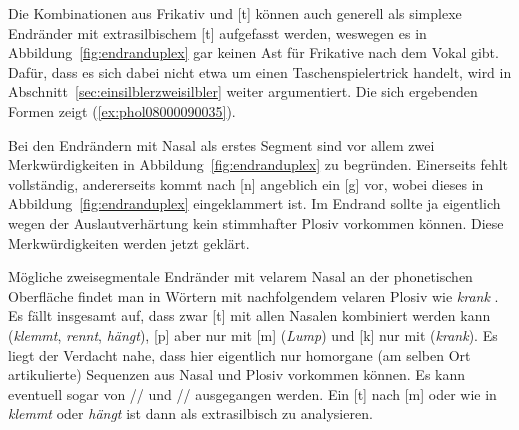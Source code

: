 \begin{exe}
  \ex \label{ex:phol0800009003}
  \begin{xlist}
  \end{xlist}
\end{exe}

Die Kombinationen aus Frikativ und [t] können auch generell als simplexe Endränder mit extrasilbischem [t] aufgefasst werden, weswegen es in Abbildung~\ref{fig:endranduplex} gar keinen Ast für Frikative nach dem Vokal gibt.
Dafür, dass es sich dabei nicht etwa um einen Taschenspielertrick handelt, wird in Abschnitt~\ref{sec:einsilblerzweisilbler} weiter argumentiert.
Die sich ergebenden Formen zeigt (\ref{ex:phol08000090035}).

\begin{exe}
  \ex \label{ex:phol08000090035}
  \begin{xlist}
  \end{xlist}
\end{exe}

Bei den Endrändern mit Nasal als erstes Segment sind vor allem zwei Merkwürdigkeiten in Abbildung~\ref{fig:endranduplex} zu begründen.
Einerseits fehlt \textipa{[N]} vollständig, andererseits kommt nach [n] angeblich ein [g] vor, wobei dieses in Abbildung~\ref{fig:endranduplex} eingeklammert ist.
Im Endrand sollte ja eigentlich wegen der Auslautverhärtung kein stimmhafter Plosiv vorkommen können.
Diese Merkwürdigkeiten werden jetzt geklärt.

Mögliche zweisegmentale Endränder mit velarem Nasal \textipa{[N]} an der phonetischen Oberfläche findet man in Wörtern mit nachfolgendem velaren Plosiv wie \textit{krank} \textipa{[kKaNk]}.
Es fällt insgesamt auf, dass zwar [t] mit allen Nasalen kombiniert werden kann (\textit{klemmt}, \textit{rennt}, \textit{hängt}), [p] aber nur mit [m] (\textit{Lump}) und [k] nur mit \textipa{[N]} (\textit{krank}).
Es liegt der Verdacht nahe, dass hier eigentlich nur homorgane (am selben Ort artikulierte) Sequenzen aus Nasal und Plosiv vorkommen können.
Es kann eventuell sogar von // \phopro \textipa{[kKaNk]} und // \phopro \textipa{[lUmp]} ausgegangen werden. 
Ein [t] nach [m] oder \textipa{[N]} wie in \textit{klemmt} oder \textit{hängt} ist dann als extrasilbisch zu analysieren.

